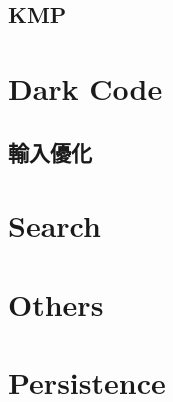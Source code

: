 \documentclass[10pt,twocolumn,oneside]{article}
\begin{document}
\subsection{KMP}


\section{Dark Code}

\subsection{輸入優化}


\section{Search}


\section{Others}


\section{Persistence}

\end{document}
